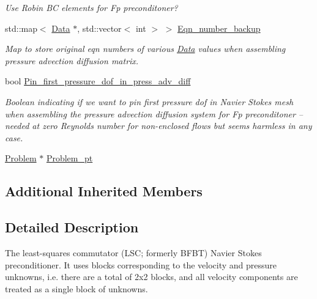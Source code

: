 \begin{DoxyCompactItemize}
\begin{DoxyCompactList}\small\item\em Use Robin BC elements for Fp preconditoner? \end{DoxyCompactList}\item 
std\+::map$<$ \hyperlink{classoomph_1_1Data}{Data} $\ast$, std\+::vector$<$ int $>$ $>$ \hyperlink{classoomph_1_1NavierStokesSchurComplementPreconditioner_a7677eca3c799be64774cae9a23c8c858}{Eqn\+\_\+number\+\_\+backup}
\begin{DoxyCompactList}\small\item\em Map to store original eqn numbers of various \hyperlink{classoomph_1_1Data}{Data} values when assembling pressure advection diffusion matrix. \end{DoxyCompactList}\item 
bool \hyperlink{classoomph_1_1NavierStokesSchurComplementPreconditioner_a40ffaa90de4f861037cbd364789eb889}{Pin\+\_\+first\+\_\+pressure\+\_\+dof\+\_\+in\+\_\+press\+\_\+adv\+\_\+diff}
\begin{DoxyCompactList}\small\item\em Boolean indicating if we want to pin first pressure dof in Navier Stokes mesh when assembling the pressure advection diffusion system for Fp preconditoner -- needed at zero Reynolds number for non-\/enclosed flows but seems harmless in any case. \end{DoxyCompactList}\item 
\hyperlink{classoomph_1_1Problem}{Problem} $\ast$ \hyperlink{classoomph_1_1NavierStokesSchurComplementPreconditioner_a32957b16d3827ea7e6f308e1f3b6f246}{Problem\+\_\+pt}
\end{DoxyCompactItemize}
\subsection*{Additional Inherited Members}


\subsection{Detailed Description}
The least-\/squares commutator (L\+SC; formerly B\+F\+BT) Navier Stokes preconditioner. It uses blocks corresponding to the velocity and pressure unknowns, i.\+e. there are a total of 2x2 blocks, and all velocity components are treated as a single block of unknowns. 


